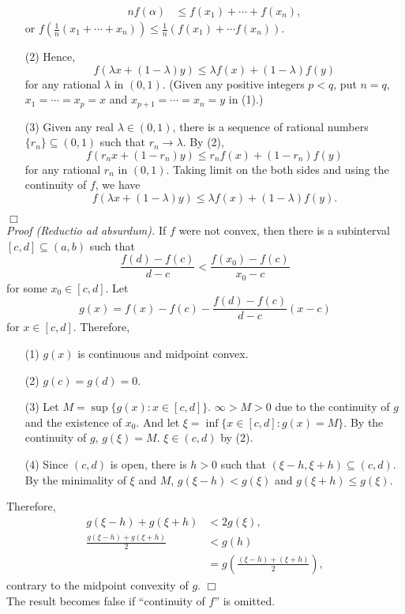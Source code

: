 \documentclass{article}
\begin{document}
\begin{enumerate}
\begin{align*}
  n f(\alpha)
  &\leq f(x_1) + \cdots + f(x_n),
\end{align*}
or $f\left( \frac{1}{n} (x_1 + \cdots + x_n) \right)
\leq \frac{1}{n}(f(x_1) + \cdots f(x_n))$.
\item[(2)]
Hence,
$$f(\lambda x + (1 - \lambda) y) \leq \lambda f(x) + (1 - \lambda) f(y)$$
for any rational $\lambda$ in $(0,1)$.
(Given any positive integers $p < q$,
put $n = q$,
$x_1 = \cdots = x_p = x$
and $x_{p+1} = \cdots = x_n = y$ in (1).)
\item[(3)]
Given any real $\lambda \in (0,1)$,
there is a sequence of rational numbers $\{r_n\} \subseteq (0, 1)$
such that $r_n \to \lambda$.
By (2),
$$f(r_n x + (1 - r_n) y) \leq r_n f(x) + (1 - r_n) f(y)$$
for any rational $r_n$ in $(0,1)$.
Taking limit on the both sides and using the continuity of $f$,
we have
$$f(\lambda x + (1 - \lambda) y) \leq \lambda f(x) + (1 - \lambda) f(y).$$
\end{enumerate}
$\Box$ \\

\emph{Proof (Reductio ad absurdum).}
If $f$ were not convex,
then there is a subinterval $[c,d] \subseteq (a,b)$
such that
$$\frac{f(d)-f(c)}{d-c} < \frac{f(x_0)-f(c)}{x_0-c}$$
for some $x_0 \in [c, d]$.
Let
$$g(x) = f(x)-f(c) - \frac{f(d)-f(c)}{d-c}(x - c)$$
for $x \in [c,d]$.
Therefore,
\begin{enumerate}
\item[(1)]
$g(x)$ is continuous and midpoint convex.
\item[(2)]
$g(c) = g(d) = 0$.
\item[(3)]
Let $M = \sup\{g(x) : x \in [c,d]\}$.
$\infty > M > 0$ due to the continuity of $g$ and the existence of $x_0$.
And let $\xi = \inf \{ x \in [c,d] : g(x) = M \}$.
By the continuity of $g$, $g(\xi) = M$.
$\xi \in (c,d)$ by (2).
\item[(4)]
Since $(c,d)$ is open, there is $h > 0$ such that $(\xi-h,\xi+h) \subseteq (c,d)$.
By the minimality of $\xi$ and $M$, $g(\xi-h) < g(\xi)$ and $g(\xi+h) \leq g(\xi)$.
\end{enumerate}
Therefore,
\begin{align*}
g(\xi-h) + g(\xi+h)
&< 2 g(\xi), \\
\frac{g(\xi-h) + g(\xi+h)}{2}
&< g(h) \\
&= g\left( \frac{(\xi-h) + (\xi+h)}{2} \right),
\end{align*}
contrary to the midpoint convexity of $g$.
$\Box$ \\

The result becomes false if ``continuity of $f$'' is omitted. \\\\
\end{document}
